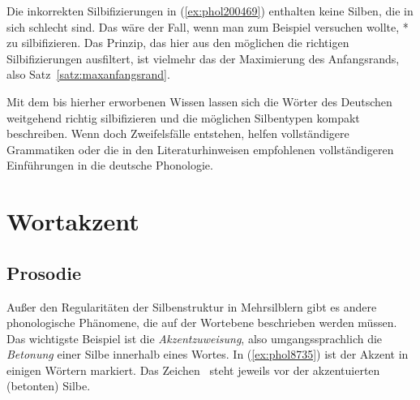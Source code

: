 Die inkorrekten Silbifizierungen in (\ref{ex:phol200469}) enthalten keine Silben, die in sich schlecht sind.
Das wäre der Fall, wenn man zum Beispiel versuchen wollte, *\textipa{[kOmpl.Et]} zu silbifizieren.
Das Prinzip, das hier aus den möglichen die richtigen Silbifizierungen ausfiltert, ist vielmehr das der Maximierung des Anfangsrands, also Satz~\ref{satz:maxanfangsrand}.


Mit dem bis hierher erworbenen Wissen lassen sich die Wörter des Deutschen weitgehend richtig silbifizieren und die möglichen Silbentypen kompakt beschreiben.
Wenn doch Zweifelsfälle entstehen, helfen vollständigere Grammatiken oder die in den Literaturhinweisen empfohlenen vollständigeren Einführungen in die deutsche Phonologie.

\section{Wortakzent}

\label{sec:prosodie}


\subsection{Prosodie}

Außer den Regularitäten der Silbenstruktur in Mehrsilblern gibt es andere phonologische Phänomene, die auf der Wortebene beschrieben werden müssen.
Das wichtigste Beispiel ist die \textit{Akzentzuweisung}, also umgangssprachlich die \textit{Betonung} einer Silbe innerhalb eines Wortes.
In (\ref{ex:phol8735}) ist der Akzent in einigen Wörtern markiert.
Das Zeichen \Akz\ steht jeweils vor der akzentuierten (betonten) Silbe.

\begin{exe}
  \ex\label{ex:phol8735}
  \begin{xlist}
  \end{xlist}
\end{exe}

